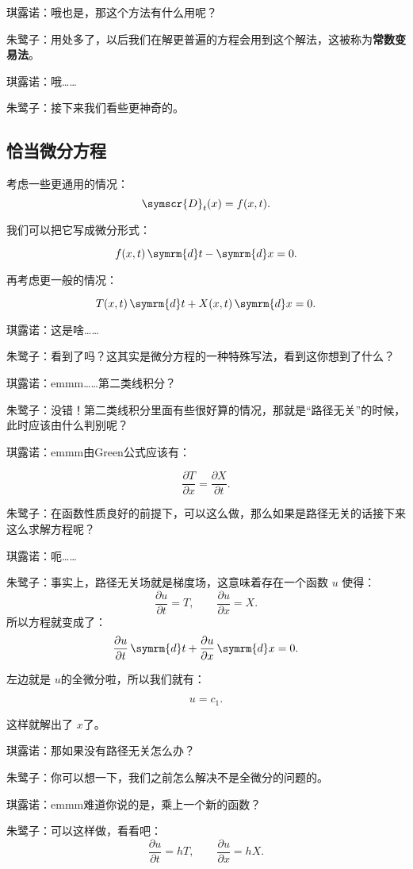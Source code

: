 \documentclass{ctexart}
\newcommand{\dx}{\symscr{D} _t (x)}
\begin{document}
琪露诺：哦也是，那这个方法有什么用呢？

朱鹭子：用处多了，以后我们在解更普遍的方程会用到这个解法，这被称为\textbf{常数变易法}。

琪露诺：哦……

朱鹭子：接下来我们看些更神奇的。

\subsection{恰当微分方程}
考虑一些更通用的情况：
\[
    \dx=f(x,t)
    .\]

我们可以把它写成微分形式：

\[
    f(x,t)\,\symrm{d} t-\symrm{d} x=0
    .\]

再考虑更一般的情况：

\[
    T(x,t)\,\symrm{d} t+ X(x,t)\,\symrm{d} x=0
    .\]

琪露诺：这是啥……

朱鹭子：看到了吗？这其实是微分方程的一种特殊写法，看到这你想到了什么？

琪露诺：emmm……第二类线积分？

朱鹭子：没错！第二类线积分里面有些很好算的情况，那就是“路径无关”的时候，此时应该由什么判别呢？

琪露诺：emmm由Green公式应该有：

\[
    \frac{\partial T}{\partial x}=\frac{\partial X}{\partial t}
    .\]

朱鹭子：在函数性质良好的前提下，可以这么做，那么如果是路径无关的话接下来这么求解方程呢？

琪露诺：呃……

朱鹭子：事实上，路径无关场就是梯度场，这意味着存在一个函数 \(u\) 使得：
\[
    \frac{\partial u}{\partial t}=T,\qquad \frac{\partial u}{\partial x}=X
    .\]
所以方程就变成了：
\[
    \frac{\partial u}{\partial t}\,\symrm{d} t+ \frac{\partial u}{\partial x}\,\symrm{d} x=0
    .\]

左边就是 \(u\)的全微分啦，所以我们就有：

\[
    u=c_1
    .\]

这样就解出了 \(x\)了。

琪露诺：那如果没有路径无关怎么办？

朱鹭子：你可以想一下，我们之前怎么解决不是全微分的问题的。

琪露诺：emmm难道你说的是，乘上一个新的函数？

朱鹭子：可以这样做，看看吧：
\[
    \frac{\partial u}{\partial t}=hT,\qquad \frac{\partial u}{\partial x}=hX
    .\]
\end{document}
